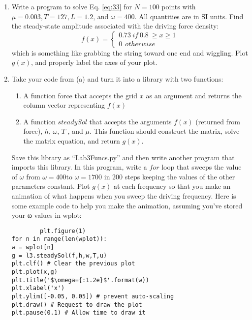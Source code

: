 \begin{problem} \label{P3.2}
\begin{enumerate}[label=(\alph*)]
	\item Write a program to solve Eq. \eqref{eq:33} for $N = 100$ points with $ \mu = 0.003,
T = 127, L = 1.2$, and $\omega = 400$. All quantities are in SI units. Find the
steady-state amplitude associated with the driving force density:
\begin{equation}\label{eq:34}
		f(x) = 
		\begin{cases}
		0.73 \ if \ 0.8 \	\geq x 	\geq 1 \\
		0 \ \ otherwise
		\end{cases}
				\end{equation}which is something like grabbing the string toward one end and wiggling. Plot $g(x)$, and properly label the axes of your plot.
				\item Take your code from (a) and turn it into a library with two functions:
				\begin{enumerate}
				\item	A function force that accepts the grid $x$ as an argument and
returns the column vector representing $f(x)$

\item A function $steadySol$ that accepts the arguments $f(x)$ (returned
from force), $h$, $\omega$, $T$ , and $\mu$. This function should construct the
matrix, solve the matrix equation, and return $g(x)$.
\end{enumerate}


Save this library as “Lab3Funcs.py” and then write another program
that imports this library. In this program, write a $for$ loop that sweeps
the value of $\omega$ from $\omega = 400$to $\omega = 1700$ in 200 steps keeping the
values of the other parameters constant. Plot $g(x)$ at each frequency
so that you make an animation of what happens when you sweep the
driving frequency. Here is some example code to help you make the
animation, assuming you\rq ve stored your ω values in wplot:
		\begin{lstlisting}
		plt.figure(1)
for n in range(len(wplot)):
w = wplot[n]
g = l3.steadySol(f,h,w,T,u)
plt.clf() # Clear the previous plot
plt.plot(x,g)
plt.title('$\omega={:1.2e}$'.format(w))
plt.xlabel('x')
plt.ylim([-0.05, 0.05]) # prevent auto-scaling
plt.draw() # Request to draw the plot
plt.pause(0.1) # Allow time to draw it
		

\end{lstlisting}
\end{enumerate}
\end{problem}
